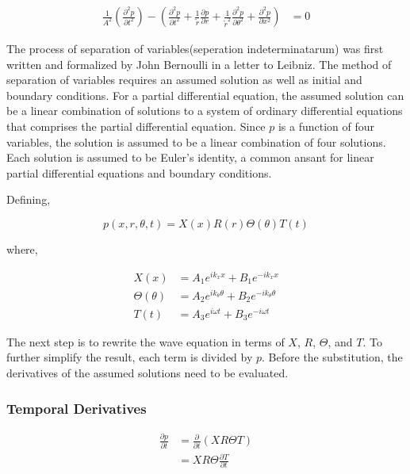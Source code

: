 \documentclass[a4paper]{report}
\begin{document}
\begin{align*} 
    \frac{1}{A^2}\left(
        \frac{\partial^2 {p}}{\partial t^2}
    \right) - 
        \left(
            \frac{\partial^2 {p}}{\partial t^2} + 
            \frac{1}{\tilde{r}}\frac{\partial p}{\partial r} +
            \frac{1}{\tilde{r}^2} \frac{\partial^2 p}{\partial \theta^2} + 
            \frac{\partial^2 p}{\partial x^2} 
        \right) &= 0  
\end{align*} 

The process of separation of variables(seperation indeterminatarum)
was first written and formalized by John Bernoulli in a letter to Leibniz. The method
of separation of variables requires an assumed solution as well as initial and boundary 
conditions. For a partial differential equation, the assumed solution can be a 
linear combination of solutions to a system of ordinary differential equations that
comprises the partial differential equation. Since $p$ is a function of four
variables, the solution is assumed to be a linear combination of four solutions.
Each solution is assumed to be Euler's identity, a common ansant for linear partial 
differential equations and boundary conditions.

Defining,

\begin{equation}
    p(x,r,\theta,t) = X(x) R(r) \Theta(\theta) T(t)
\end{equation}

where, 

\begin{align*}
    X(x) &=
    A_1 e^{ik_x x} +
    B_1 e^{-ik_x x }\\
    \Theta(\theta) &=
    A_2 e^{i k_{\theta} \theta } +
    B_2 e^{-ik_{\theta} \theta }\\
    T(t) &=
    A_3 e^{i \omega t } +
    B_3 e^{-i\omega t  }
\end{align*}

The next step is to rewrite the wave equation in terms of $X$, $R$, $\Theta$,
and $T$. To further simplify the result, each term is divided by $p$.
Before the substitution, the derivatives of the assumed solutions need to be
evaluated.


\subsubsection{Temporal Derivatives}

\begin{align*}
    \frac{\partial p}{\partial t} 
    &=
    \frac{\partial }{\partial t}  \left( XR\Theta T \right) \\
    &=
    XR\Theta\frac{\partial T}{\partial t}  
\end{align*}
\end{document}
